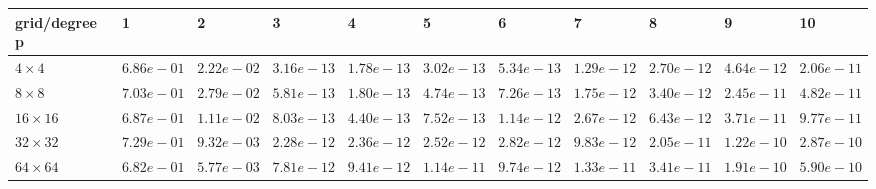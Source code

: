\begin{tabular}{lllllllllll}
\hline
 grid/degree p   & 1          & 2          & 3          & 4          & 5          & 6          & 7          & 8          & 9          & 10         \\
\hline
 $4 \times 4$    & $6.86e-01$ & $2.22e-02$ & $3.16e-13$ & $1.78e-13$ & $3.02e-13$ & $5.34e-13$ & $1.29e-12$ & $2.70e-12$ & $4.64e-12$ & $2.06e-11$ \\
 $8 \times 8$    & $7.03e-01$ & $2.79e-02$ & $5.81e-13$ & $1.80e-13$ & $4.74e-13$ & $7.26e-13$ & $1.75e-12$ & $3.40e-12$ & $2.45e-11$ & $4.82e-11$ \\
 $16 \times 16$  & $6.87e-01$ & $1.11e-02$ & $8.03e-13$ & $4.40e-13$ & $7.52e-13$ & $1.14e-12$ & $2.67e-12$ & $6.43e-12$ & $3.71e-11$ & $9.77e-11$ \\
 $32 \times 32$  & $7.29e-01$ & $9.32e-03$ & $2.28e-12$ & $2.36e-12$ & $2.52e-12$ & $2.82e-12$ & $9.83e-12$ & $2.05e-11$ & $1.22e-10$ & $2.87e-10$ \\
 $64 \times 64$  & $6.82e-01$ & $5.77e-03$ & $7.81e-12$ & $9.41e-12$ & $1.14e-11$ & $9.74e-12$ & $1.33e-11$ & $3.41e-11$ & $1.91e-10$ & $5.90e-10$ \\
\hline
\end{tabular}